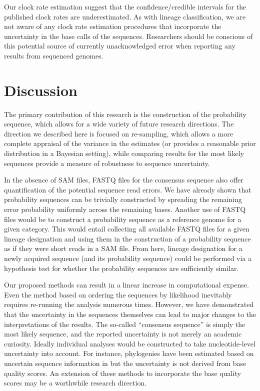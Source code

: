 \documentclass[10pt]{article}
\begin{document}
Our clock rate estimation suggest that the confidence/credible intervals for the published clock rates are underestimated.
As with lineage classification, we are not aware of any clock rate estimation procedures that incorporate the uncertainty in the base calls of the sequences.
Researchers should be conscious of this potential source of currently unacknowledged error when reporting any results from sequenced genomes.

\section{Discussion}

The primary contribution of this research is the construction of the probability sequence, which allows for a wide variety of future research directions.
The direction we described here is focused on re-sampling, which allows a more complete appraisal of the variance in the estimates (or provides a reasonable prior distribution in a Bayesian setting), while comparing results for the most likely sequences provide a measure of robustness to sequence uncertainty.

In the absence of SAM files, FASTQ files for the consensus sequence also offer quantification of the potential sequence read errors.
We have already shown that probability sequences can be trivially constructed by spreading the remaining error probability uniformly across the remaining bases.
Another use of FASTQ files would be to construct a probability sequence as a reference genome for a given category.
This would entail collecting all available FASTQ files for a given lineage designation and using them in the construction of a probability sequence as if they were short reads in a SAM file.
From here, lineage designation for a newly acquired sequence (and its probability sequence) could be performed via a hypothesis test for whether the probability sequences are sufficiently similar. 

Our proposed methods can result in a linear increase in computational expense.
Even the method based on ordering the sequences by likelihood inevitably requires re-running the analysis numerous times.
However, we have demonstrated that the uncertainty in the sequences themselves can lead to major changes to the interpretations of the results.
The so-called ``consensus sequence'' is simply the most likely sequence, and the reported uncertainty is not merely an academic curiosity.
Ideally individual analyses would be constructed to take nucleotide-level uncertainty into account.
For instance, phylogenies have been estimated based on uncertain sequence information in \citet{rossOncoNEMInferringTumor2016, jahnTreeInferenceSinglecell2016, zafarSiFitInferringTumor2017} but the uncertainty is not derived from base quality scores.
An extension of these methods to incorporate the base quality scores may be a worthwhile research direction.
\end{document}
